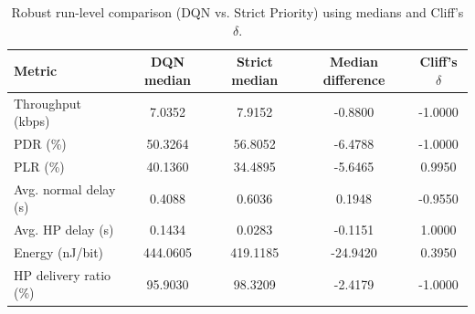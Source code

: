 \begin{table}[t]
\centering
\caption{Robust run-level comparison (DQN vs. Strict Priority) using medians and Cliff's $\delta$.}
\label{tab:robust_effects}
\scriptsize
\begin{tabular}{lcccc}
\toprule
Metric & DQN median & Strict median & Median difference & Cliff's $\delta$ \\
\midrule
Throughput (kbps) & 7.0352 & 7.9152 & -0.8800 & -1.0000 \\
PDR (\%) & 50.3264 & 56.8052 & -6.4788 & -1.0000 \\
PLR (\%) & 40.1360 & 34.4895 & -5.6465 & 0.9950 \\
Avg. normal delay (s) & 0.4088 & 0.6036 & 0.1948 & -0.9550 \\
Avg. HP delay (s) & 0.1434 & 0.0283 & -0.1151 & 1.0000 \\
Energy (nJ/bit) & 444.0605 & 419.1185 & -24.9420 & 0.3950 \\
HP delivery ratio (\%) & 95.9030 & 98.3209 & -2.4179 & -1.0000 \\
\bottomrule
\end{tabular}
\end{table}
